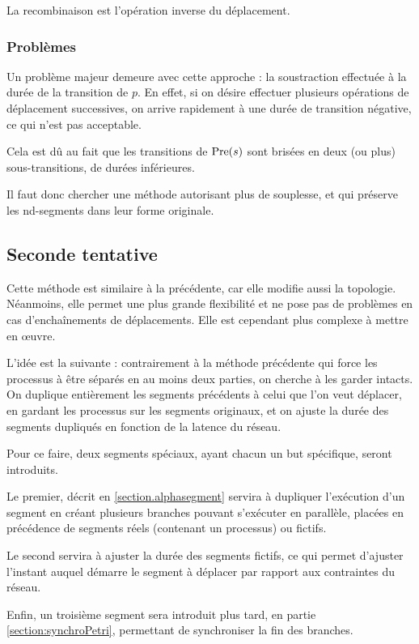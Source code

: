 La recombinaison est l'opération inverse du déplacement.

\subsubsection{Problèmes}
Un problème majeur demeure avec cette approche : la soustraction effectuée à la durée de la transition de $p$. En effet, si on désire effectuer plusieurs opérations de déplacement successives, on arrive rapidement à une durée de transition négative, ce qui n'est pas acceptable. 

Cela est dû au fait que les transitions de $\operatorname{Pre}(s)$ sont brisées en deux (ou plus) sous-transitions, de durées inférieures.

Il faut donc chercher une méthode autorisant plus de souplesse, et qui préserve les nd-segments dans leur forme originale.

\subsection{Seconde tentative}
Cette méthode est similaire à la précédente, car elle modifie aussi la topologie. Néanmoins, elle permet une plus grande flexibilité et ne pose pas de problèmes en cas d'enchaînements de déplacements.
Elle est cependant plus complexe à mettre en œuvre.

L'idée est la suivante : contrairement à la méthode précédente qui force les processus à être séparés en au moins deux parties, on cherche à les garder intacts. On duplique entièrement les segments précédents à celui que l'on veut déplacer, en gardant les processus sur les segments originaux, et on ajuste la durée des segments dupliqués en fonction de la latence du réseau.

Pour ce faire, deux segments spéciaux, ayant chacun un but spécifique, seront introduits.

Le premier, décrit en \cref{section.alphasegment} servira à dupliquer l'exécution d'un segment en créant plusieurs branches pouvant s'exécuter en parallèle, placées en précédence de segments réels (contenant un processus) ou fictifs.

Le second servira à ajuster la durée des segments fictifs, ce qui permet d'ajuster l'instant auquel démarre le segment à déplacer par rapport aux contraintes du réseau.

Enfin, un troisième segment sera introduit plus tard, en partie \ref{section:synchroPetri}, permettant de synchroniser la fin des branches.

